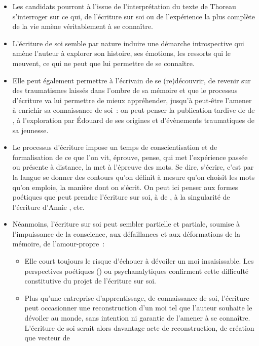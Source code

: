 {\begin{itemize}[label=\textbullet]
\item Les candidats pourront à l'issue de l'interprétation du texte de Thoreau s'interroger sur ce
qui, de l'écriture sur soi ou de l'expérience la plus complète de la vie amène véritablement
à se connaître.
\item L'écriture de soi semble par nature induire une démarche introspective qui amène l'auteur
à explorer son histoire, ses émotions, les ressorts qui le meuvent, ce qui ne peut que lui
permettre de se connaître.
\item Elle peut également permettre à l'écrivain de se (re)découvrir, de revenir sur des
traumatismes laissés dans l'ombre de sa mémoire et que le processus d'écriture va lui
permettre de mieux appréhender, jusqu'à peut-être l'amener à enrichir sa connaissance
de soi~: on peut penser la publication tardive de  de , à l'exploration par
Édouard  de ses origines et d'évènements traumatiques de sa jeunesse.
\item Le processus d'écriture impose un temps de conscientisation et de formalisation de ce
que l'on vit, éprouve, pense, qui met l'expérience passée ou présente à distance, la met
à l'épreuve des mots. Se dire, s'écrire, c'est par la langue se donner des contours qu'on
définit à mesure qu'on choisit les mots qu'on emploie, la manière dont on s'écrit. On peut
ici penser aux formes poétiques que peut prendre l'écriture sur soi, à  de
, à la singularité de l'écriture d'Annie , etc.
\item Néanmoins, l'écriture sur soi peut sembler partielle et partiale, soumise à l'impuissance
de la conscience, aux défaillances et aux déformations de la mémoire, de l'amour-propre~:
\begin{itemize}[label=$\circ$]
\item Elle court toujours le risque d'échouer à dévoiler un moi insaisissable. Les
perspectives poétiques () ou psychanalytiques confirment cette difficulté
constitutive du projet de l'écriture sur soi.
\item Plus qu'une entreprise d'apprentissage, de connaissance de soi, l'écriture peut
occasionner une reconstruction d'un moi tel que l'auteur souhaite le dévoiler au
monde, sans intention ni garantie de l'amener à se connaître. L'écriture de soi
serait alors davantage acte de reconstruction, de création que vecteur de

\end{itemize}
\end{itemize}}
